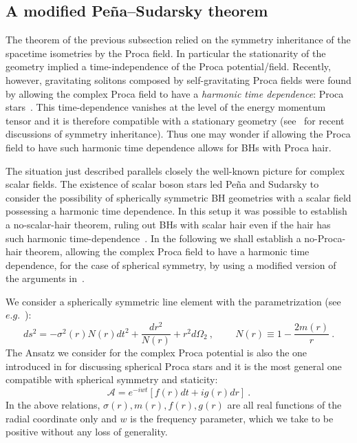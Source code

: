\documentclass{article}
\numberwithin{equation}{section}
\begin{document}
\subsection{A modified Pe\~{n}a--Sudarsky theorem}
\label{sec_nohair2}
The theorem of the previous subsection relied on the symmetry inheritance of the spacetime isometries by the Proca field. In particular the stationarity of the geometry implied a time-independence of the Proca potential/field. Recently, however, gravitating solitons composed by self-gravitating Proca fields were found by allowing the complex Proca field to have a \textit{harmonic time dependence}: Proca stars~\cite{Brito:2015pxa}. This time-dependence vanishes at the level of the energy momentum tensor and it is therefore compatible with a stationary geometry (see~\cite{Smolic:2015txa} for recent discussions of symmetry inheritance). Thus one may wonder if allowing the Proca field to have such harmonic time dependence allows for BHs with Proca hair. 

The situation just described parallels closely the well-known picture for complex scalar fields. The existence of scalar boson stars led Pe\~{n}a and Sudarsky to consider the possibility of spherically symmetric BH geometries with a scalar field possessing a harmonic time dependence. In this setup it was possible to establish a no-scalar-hair theorem, ruling out BHs with scalar hair even if the hair has such harmonic time-dependence~\cite{Pena:1997cy}. In the following we shall establish a no-Proca-hair theorem, allowing the complex Proca field to have a harmonic time dependence, for the case of spherical symmetry, by using a modified version of the arguments in~\cite{Pena:1997cy}. 

We consider a spherically symmetric line element with the parametrization (see $e.g.$~\cite{Brito:2015pxa}):
%
\begin{equation}
ds^2=-\sigma^2(r)N(r)dt^2+\frac{dr^2}{N(r)}+r^2d\Omega_2 \ ,  \qquad \ N(r)\equiv 1-\frac{2m(r)}{r} \ .
\label{ansatz1}
\end{equation}
%
The Ansatz we consider for the complex Proca potential is also the one introduced in \cite{Brito:2015pxa} for discussing spherical Proca stars and it is the most general one compatible with spherical symmetry and staticity:
%
\begin{equation}
\mathcal{A}=e^{-iwt}\left[f(r)dt+ig(r)dr \right] \ .
\label{ansatz2}
\end{equation}
%
In the above relations, $\sigma(r),m(r),f(r),g(r)$ 
are all real functions of the radial coordinate only and $w$ is the frequency parameter, which we take to
be positive without any loss of generality. 
\end{document}
